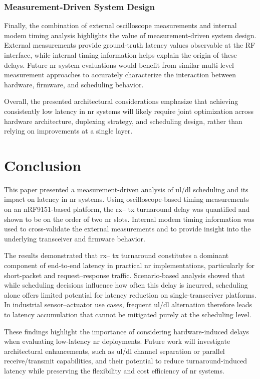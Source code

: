 \documentclass[conference]{IEEEtran}
\begin{document}
\subsubsection{Measurement-Driven System Design}

Finally, the combination of external oscilloscope measurements and internal modem timing analysis highlights the value of measurement-driven system design. External measurements provide ground-truth latency values observable at the RF interface, while internal timing information helps explain the origin of these delays. Future \gls{nr} system evaluations would benefit from similar multi-level measurement approaches to accurately characterize the interaction between hardware, firmware, and scheduling behavior.

Overall, the presented architectural considerations emphasize that achieving consistently low latency in \gls{nr} systems will likely require joint optimization across hardware architecture, duplexing strategy, and scheduling design, rather than relying on improvements at a single layer.

\section{Conclusion}

This paper presented a measurement-driven analysis of \gls{ul}/\gls{dl} scheduling and its impact on latency in \gls{nr} systems. Using oscilloscope-based timing measurements on an nRF9151-based platform, the  \gls{rx}-- \gls{tx} turnaround delay was quantified and shown to be on the order of two \gls{nr} slots. Internal modem timing information was used to cross-validate the external measurements and to provide insight into the underlying transceiver and firmware behavior.

The results demonstrated that  \gls{rx}-- \gls{tx} turnaround constitutes a dominant component of end-to-end latency in practical \gls{nr} implementations, particularly for short-packet and request--response traffic. Scenario-based analysis showed that while scheduling decisions influence how often this delay is incurred, scheduling alone offers limited potential for latency reduction on single-transceiver platforms. In industrial sensor--actuator use cases, frequent \gls{ul}/\gls{dl} alternation therefore leads to latency accumulation that cannot be mitigated purely at the scheduling level.

These findings highlight the importance of considering hardware-induced delays when evaluating low-latency \gls{nr} deployments. Future work will investigate architectural enhancements, such as \gls{ul}/\gls{dl} channel separation or parallel receive/transmit capabilities, and their potential to reduce turnaround-induced latency while preserving the flexibility and cost efficiency of \gls{nr} systems.




\end{document}
